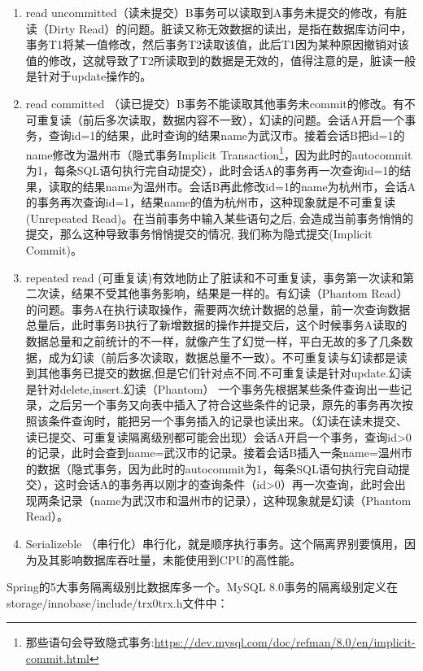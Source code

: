 \documentclass[../../../interview-questions.tex]{subfiles}
\begin{document}
\begin{enumerate}
\item {read uncommitted（读未提交）B事务可以读取到A事务未提交的修改，有脏读（Dirty Read）的问题。}脏读又称无效数据的读出，是指在数据库访问中，事务T1将某一值修改，然后事务T2读取该值，此后T1因为某种原因撤销对该值的修改，这就导致了T2所读取到的数据是无效的，值得注意的是，脏读一般是针对于update操作的。
\item{read committed （读已提交）B事务不能读取其他事务未commit的修改。有不可重复读（前后多次读取，数据内容不一致），幻读的问题。}会话A开启一个事务，查询id=1的结果，此时查询的结果name为武汉市。接着会话B把id=1的name修改为温州市（隐式事务Implicit Transaction\footnote{那些语句会导致隐式事务:\url{https://dev.mysql.com/doc/refman/8.0/en/implicit-commit.html}}，因为此时的autocommit为1，每条SQL语句执行完自动提交），此时会话A的事务再一次查询id=1的结果，读取的结果name为温州市。会话B再此修改id=1的name为杭州市，会话A的事务再次查询id=1，结果name的值为杭州市，这种现象就是不可重复读(Unrepeated Read)。在当前事务中输入某些语句之后, 会造成当前事务悄悄的提交，那么这种导致事务悄悄提交的情况, 我们称为隐式提交(Implicit Commit)。
\item{repeated read (可重复读)有效地防止了脏读和不可重复读，事务第一次读和第二次读，结果不受其他事务影响，结果是一样的。有幻读（Phantom Read）的问题。事务A在执行读取操作，需要两次统计数据的总量，前一次查询数据总量后，此时事务B执行了新增数据的操作并提交后，这个时候事务A读取的数据总量和之前统计的不一样，就像产生了幻觉一样，平白无故的多了几条数据，成为幻读（前后多次读取，数据总量不一致）。不可重复读与幻读都是读到其他事务已提交的数据,但是它们针对点不同.不可重复读是针对update.幻读是针对delete,insert.}幻读（Phantom）
一个事务先根据某些条件查询出一些记录，之后另一个事务又向表中插入了符合这些条件的记录，原先的事务再次按照该条件查询时，能把另一个事务插入的记录也读出来。（幻读在读未提交、读已提交、可重复读隔离级别都可能会出现）会话A开启一个事务，查询id>0的记录，此时会查到name=武汉市的记录。接着会话B插入一条name=温州市的数据（隐式事务，因为此时的autocommit为1，每条SQL语句执行完自动提交），这时会话A的事务再以刚才的查询条件（id>0）再一次查询，此时会出现两条记录（name为武汉市和温州市的记录），这种现象就是幻读（Phantom Read）。
\item{Serializeble （串行化）串行化，就是顺序执行事务。这个隔离界别要慎用，因为及其影响数据库吞吐量，未能使用到CPU的高性能。}
\end{enumerate}

Spring的5大事务隔离级别比数据库多一个。MySQL 8.0事务的隔离级别定义在storage/innobase/include/trx0trx.h文件中：
\end{document}
